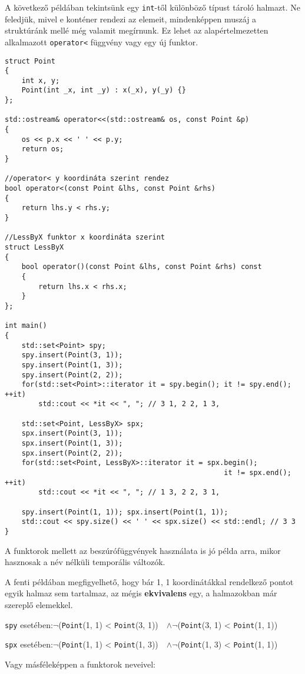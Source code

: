 \documentclass[../cpp_book/cpp_book.tex]{subfiles}
\begin{document}
	\medskip
	A következő példában tekintsünk egy \texttt{int}-től különböző típust tároló halmazt. Ne feledjük, mivel e konténer rendezi az elemeit, mindenképpen muszáj a struktúránk mellé még valamit megírnunk. Ez lehet az alapértelmezetten alkalmazott \texttt{operator<} függvény vagy egy új funktor.
\begin{lstlisting}
struct Point
{
	int x, y;
	Point(int _x, int _y) : x(_x), y(_y) {}
};

std::ostream& operator<<(std::ostream& os, const Point &p)
{
	os << p.x << ' ' << p.y;
	return os;
}

//operator< y koordináta szerint rendez
bool operator<(const Point &lhs, const Point &rhs)
{
	return lhs.y < rhs.y;
}

//LessByX funktor x koordináta szerint
struct LessByX
{
	bool operator()(const Point &lhs, const Point &rhs) const
	{
		return lhs.x < rhs.x;
	}
};

int main()
{	
	std::set<Point> spy;
	spy.insert(Point(3, 1));
	spy.insert(Point(1, 3));
	spy.insert(Point(2, 2));
	for(std::set<Point>::iterator it = spy.begin(); it != spy.end(); ++it)
		std::cout << *it << ", "; // 3 1, 2 2, 1 3,
	
	std::set<Point, LessByX> spx;
	spx.insert(Point(3, 1));
	spx.insert(Point(1, 3));
	spx.insert(Point(2, 2));
	for(std::set<Point, LessByX>::iterator it = spx.begin(); 
												    it != spx.end(); ++it)
		std::cout << *it << ", "; // 1 3, 2 2, 3 1,
	
	spy.insert(Point(1, 1)); spx.insert(Point(1, 1));
	std::cout << spy.size() << ' ' << spx.size() << std::endl; // 3 3
}
\end{lstlisting}
	\begin{note}
		A funktorok mellett az beszúrófüggvények használata is jó példa arra, mikor hasznosak a név nélküli temporális változók.
	\end{note}
	A fenti példában megfigyelhető, hogy bár 1, 1 koordinátákkal rendelkező pontot egyik halmaz sem tartalmaz, az mégis \textbf{ekvivalens} egy, a halmazokban már szereplő elemekkel.
	
	\begin{center}	
		\texttt{spy} esetében:\quad  $\neg$\big(\texttt{Point}(1, 1) < \texttt{Point}(3, 1)\big) \,\, $\wedge$\quad $\neg$\big(\texttt{Point}(3, 1) < \texttt{Point}(1, 1)\big)
		
		\texttt{spx} esetében:\quad  $\neg$\big(\texttt{Point}(1, 1) < \texttt{Point}(1, 3)\big) \,\, $\wedge$\quad $\neg$\big(\texttt{Point}(1, 3) < \texttt{Point}(1, 1)\big)
	\end{center}
	Vagy másféleképpen a funktorok neveivel:
	
\end{document}
